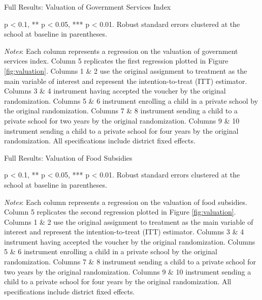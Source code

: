 \documentclass[hidelinks, 12pt, titlepage]{article}
\begin{document}
				\clearpage

				\begin{landscape}

				\begin{table}
					\begin{threeparttable}
						\centering
						\caption{Full Results: Valuation of Government Services Index\label{table:appendixvaluation}}
						
						\begin{tablenotes}
							\item * p < 0.1, ** p < 0.05, *** p < 0.01. Robust standard errors clustered at the school at baseline in parentheses.
							\item \emph{Notes}: Each column represents a regression on the valuation of government services index.  Column 5 replicates the first regression plotted in Figure \ref{fig:valuation}.  Columns 1 \& 2 use the original assignment to treatment as the main variable of interest and represent the intention-to-treat (ITT) estimator.  Columns 3 \& 4 instrument having accepted the voucher by the original randomization.  Columns 5 \& 6 instrument enrolling a child in a private school by the original randomization.  Columns 7 \& 8 instrument sending a child to a private school for two years by the original randomization.  Columns 9 \& 10 instrument sending a child to a private school for four years by the original randomization.  All specifications include district fixed effects.
						\end{tablenotes}
					\end{threeparttable}
				\end{table}

				\clearpage

				\begin{table}
					\begin{threeparttable}
						\centering
						\caption{Full Results: Valuation of Food Subsidies\label{table:appendixvaluationpds}}
						
						\begin{tablenotes}
							\item * p < 0.1, ** p < 0.05, *** p < 0.01. Robust standard errors clustered at the school at baseline in parentheses.
							\item \emph{Notes}: Each column represents a regression on the valuation of food subsidies.  Column 5 replicates the second regression plotted in Figure \ref{fig:valuation}.  Columns 1 \& 2 use the original assignment to treatment as the main variable of interest and represent the intention-to-treat (ITT) estimator.  Columns 3 \& 4 instrument having accepted the voucher by the original randomization.  Columns 5 \& 6 instrument enrolling a child in a private school by the original randomization.  Columns 7 \& 8 instrument sending a child to a private school for two years by the original randomization.  Columns 9 \& 10 instrument sending a child to a private school for four years by the original randomization.  All specifications include district fixed effects.
						\end{tablenotes}
					\end{threeparttable}
				\end{table}


\end{landscape}
\end{document}
